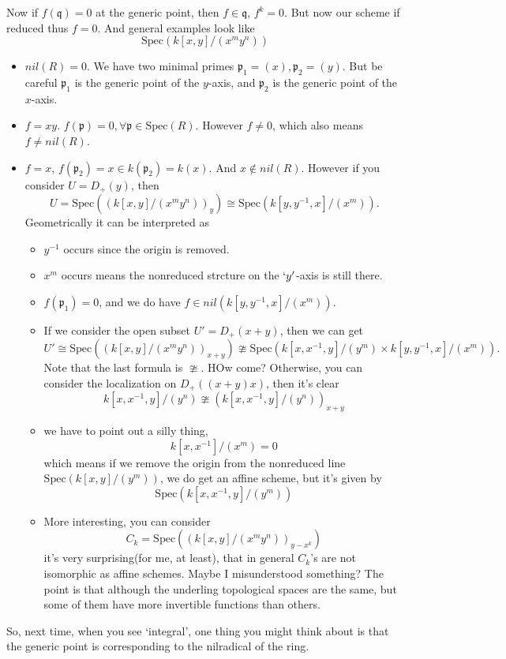 \documentclass[../main.tex]{subfiles}
\begin{document}
\begin{example}
Now if $f(\mathfrak{q})=0$ at the generic point, then $f\in \mathfrak{q}$, $f^{k}=0$. But now our scheme if reduced thus $f=0$. And general examples look like
$$\mathrm{Spec}(k[x,y]/(x^{m}y^{n}))$$
\begin{itemize}
\item $nil(R)=0.$ We have two minimal primes $\mathfrak{p}_{1}=(x),\mathfrak{p}_{2}=(y)$. But be careful $\mathfrak{p}_{1}$ is the generic point of the $y$-axis,  and $\mathfrak{p}_{2}$ is the generic point of the $x$-axis.
\item $f=xy$. $f(\mathfrak{p})=0, \forall \mathfrak{p}\in \mathrm{Spec}(R)$. However $f\neq 0$, which also means $f\neq nil(R).$
\item $f=x$, $f(\mathfrak{p}_{2})=x\in k(\mathfrak{p}_{2})=k(x)$. And $x\notin nil(R)$. However if you consider $U=D_{+}(y)$, then 
$$U=\mathrm{Spec}((k[x,y]/(x^{m}y^{n}))_{y})\cong \mathrm{Spec}(k[y,y^{-1},x]/(x^{m})).$$
Geometrically it can be interpreted as
\begin{itemize}
\item $y^{-1}$ occurs since the origin is removed.
\item $x^{m}$ occurs means the nonreduced strcture on the $`y'$-axis is still there.
\item $f(\mathfrak{p}_{1})=0$, and we do have $f\in nil(k[y,y^{-1},x]/(x^{m}))$.
\item If we consider the open subset $U'=D_{+}(x+y)$, then we can get 
$$U'\cong \mathrm{Spec}((k[x,y]/(x^{m}y^{n}))_{x+y})\ncong \mathrm{Spec}(k[x,x^{-1},y]/(y^{m})\times k[y,y^{-1},x]/(x^{m})). $$
Note that the last formula is $\ncong$. HOw come? Otherwise, you can consider the localization on $D_{+}((x+y)x)$, then it's clear 
$$k[x,x^{-1},y]/(y^{n})\ncong (k[x,x^{-1},y]/(y^{n}))_{x+y}$$
\item we have to point out a silly thing, 
$$k[x,x^{-1}]/(x^{m})=0$$
which means if we remove the origin from the nonreduced line $\mathrm{Spec}(k[x,y]/(y^{m}))$, we do get an affine scheme, but it's given by 
$$\mathrm{Spec}(k[x,x^{-1},y]/(y^{m}))$$
\item More interesting, you can consider 
$$C_{k}=\mathrm{Spec}((k[x,y]/(x^{m}y^{n}))_{y-x^{k}})$$
it's very surprising(for me, at least), that in general $C_{k}$'s are not isomorphic as affine schemes. Maybe I misunderstood something? The point is that although the underling topological spaces are the same, but some of them have more invertible functions than others.
\end{itemize}
\end{itemize}

\end{example}
\begin{remark}[Integral = reduced+ irreducible]
So, next time, when you see `integral', one thing you might think about is that the generic point is corresponding to the nilradical of the ring.
\end{remark}
\end{document}

